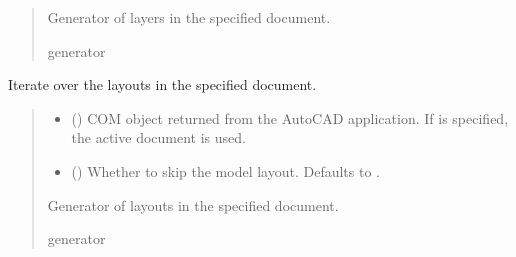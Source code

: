 \documentclass[a4paper,10pt,english]{sphinxmanual}
\begin{document}
\begin{fulllineitems}
\begin{fulllineitems}
\begin{quote}
\begin{description}
\sphinxAtStartPar
Generator of layers in the specified document.

\sphinxAtStartPar
generator

\end{description}\end{quote}

\end{fulllineitems}


\begin{fulllineitems}
\label{\detokenize{API:pyacad.Autocad.Autocad.iter_layouts}}
\pysigstartsignatures
{}
\pysigstopsignatures
\sphinxAtStartPar
Iterate over the layouts in the specified document.
\begin{quote}\begin{description}
\begin{itemize}
\item {} 
\sphinxAtStartPar
{} (\sphinxstyleliteralemphasis{\sphinxupquote{, }}) \textendash{} COM object returned from the AutoCAD application. If  is specified,
the active document is used.

\item {} 
\sphinxAtStartPar
{} () \textendash{} Whether to skip the model layout. Defaults to .

\end{itemize}

\sphinxAtStartPar
Generator of layouts in the specified document.

\sphinxAtStartPar
generator

\end{description}\end{quote}

\end{fulllineitems}


\end{fulllineitems}
\end{document}
